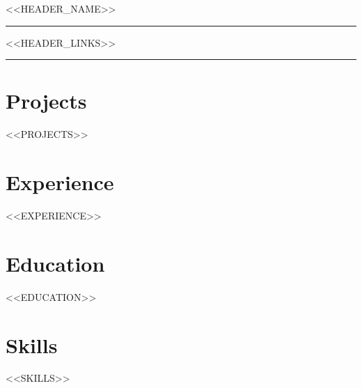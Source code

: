 \documentclass[letterpaper,10pt]{article}
\newcommand{\documentTitle}[2]{
  \begin{center}
    {\Huge\color{accentTitle} #1}
    \vspace{5pt}
    {\color{accentLine} \hrule}
    \vspace{2pt}
    \footnotesize{#2}
    \vspace{2pt}
    {\color{accentLine} \hrule}
  \end{center}
}
\begin{document}
\documentTitle{<<HEADER_NAME>>}{
    <<HEADER_LINKS>>
}

\section{Projects}

<<PROJECTS>>

\section{Experience}

<<EXPERIENCE>>

\section{Education}

<<EDUCATION>>

\section{Skills}

<<SKILLS>>
\end{document}
